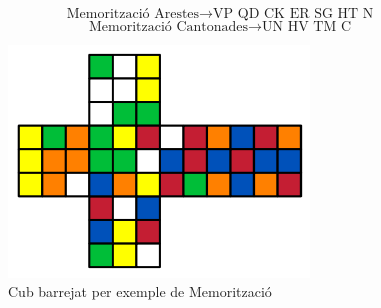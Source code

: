 $$ \textrm{Memorització Arestes} \rightarrow \textrm{VP QD CK ER SG HT N}$$
$$ \textrm{Memorització Cantonades} \rightarrow \textrm{UN HV TM C}$$

\begin{figure}[!ht]
    \centering
    \includegraphics[width=8cm]{img/cubes/cub-barrejat.png}
    \caption{Cub barrejat per exemple de Memorització}
    \label{fig:exemple-memo}
    \end{figure}


